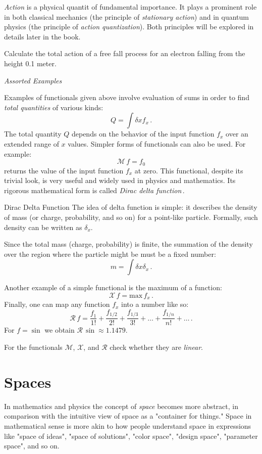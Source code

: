 \emph{Action} is a physical quantit of fundamental importance. It plays a prominent role in both classical mechanics (the principle of \emph{stationary action}) and in quantum physics (the principle of \emph{action quantization}). Both principles will be explored in details later in the book.

\begin{exercise}
	Calculate the total action of a free fall process for an electron falling from the height 0.1 meter.
\end{exercise}


\begin{flushleft}
	{\it Assorted Examples}
\end{flushleft}
Examples of functionals given above involve evaluation of sums in order to find  \emph{total quantities} of various kinds:
\[
Q = \int \delta x f_x\,.
\]
The total quantity $Q$ depends on the behavior of the input function $f_x$ over an extended range of $x$ values. Simpler forms of functionals can also be used. For example:
\[
\mathcal{M}\, f = f_0
\]
returns the value of the input function $f_x$ at zero. This functional, despite its trivial look, is very useful and widely used in physics and mathematics. Its rigorous mathematical form is called \emph{Dirac delta function}\,.
\begin{mybio}{Dirac Delta Function}
	The idea of delta function is simple: it describes the density of mass (or charge, probability, and so on) for a point-like particle. Formally, such density can be written as $\delta_x$.
	
	Since the total mass (charge, probability) is finite, the summation of the density over the region where the particle might be must be a fixed number:
	\[
	m = \int \delta x \delta_x\,.
	\]
\end{mybio}

Another example of a simple functional is the maximum of a function:
\[
\mathcal{X}\,f = \textrm{max}\,f_x\,.
\]
Finally, one can map any function $f_x$ into a number like so:
\[
\mathcal{R}\,f = \frac{f_1}{1!} + \frac{f_{1/2}}{2!} + \frac{f_{1/3}}{3!}+\ldots+\frac{f_{1/n}}{n!}+\ldots\,.
\]
For $f=\sin$ we obtain $\mathcal{R}\,\sin\approx 1.1479$.
\begin{exercise}
	For the functionals $\mathcal{M}$, $\mathcal{X}$, and $\mathcal{R}$ check whether they are \emph{linear}.
\end{exercise}

\section{Spaces}
In mathematics and physics the concept of \emph{space} becomes more abstract, in comparison with the intuitive view of space as a "container for things." Space in mathematical sense is more akin to how people understand space in expressions like "space of ideas", "space of solutions", "color space", "design space", "parameter space", and so on.

